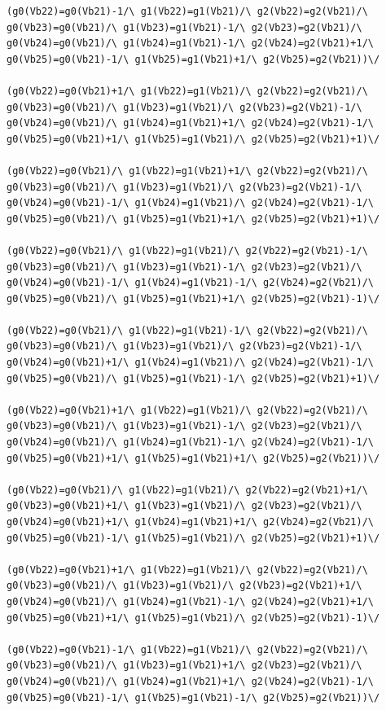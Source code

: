 \begin{appendices}
\begin{lstlisting}
(g0(Vb22)=g0(Vb21)-1/\ g1(Vb22)=g1(Vb21)/\ g2(Vb22)=g2(Vb21)/\ g0(Vb23)=g0(Vb21)/\ g1(Vb23)=g1(Vb21)-1/\ g2(Vb23)=g2(Vb21)/\ g0(Vb24)=g0(Vb21)/\ g1(Vb24)=g1(Vb21)-1/\ g2(Vb24)=g2(Vb21)+1/\ g0(Vb25)=g0(Vb21)-1/\ g1(Vb25)=g1(Vb21)+1/\ g2(Vb25)=g2(Vb21))\/ 

(g0(Vb22)=g0(Vb21)+1/\ g1(Vb22)=g1(Vb21)/\ g2(Vb22)=g2(Vb21)/\ g0(Vb23)=g0(Vb21)/\ g1(Vb23)=g1(Vb21)/\ g2(Vb23)=g2(Vb21)-1/\ g0(Vb24)=g0(Vb21)/\ g1(Vb24)=g1(Vb21)+1/\ g2(Vb24)=g2(Vb21)-1/\ g0(Vb25)=g0(Vb21)+1/\ g1(Vb25)=g1(Vb21)/\ g2(Vb25)=g2(Vb21)+1)\/ 

(g0(Vb22)=g0(Vb21)/\ g1(Vb22)=g1(Vb21)+1/\ g2(Vb22)=g2(Vb21)/\ g0(Vb23)=g0(Vb21)/\ g1(Vb23)=g1(Vb21)/\ g2(Vb23)=g2(Vb21)-1/\ g0(Vb24)=g0(Vb21)-1/\ g1(Vb24)=g1(Vb21)/\ g2(Vb24)=g2(Vb21)-1/\ g0(Vb25)=g0(Vb21)/\ g1(Vb25)=g1(Vb21)+1/\ g2(Vb25)=g2(Vb21)+1)\/ 

(g0(Vb22)=g0(Vb21)/\ g1(Vb22)=g1(Vb21)/\ g2(Vb22)=g2(Vb21)-1/\ g0(Vb23)=g0(Vb21)/\ g1(Vb23)=g1(Vb21)-1/\ g2(Vb23)=g2(Vb21)/\ g0(Vb24)=g0(Vb21)-1/\ g1(Vb24)=g1(Vb21)-1/\ g2(Vb24)=g2(Vb21)/\ g0(Vb25)=g0(Vb21)/\ g1(Vb25)=g1(Vb21)+1/\ g2(Vb25)=g2(Vb21)-1)\/ 

(g0(Vb22)=g0(Vb21)/\ g1(Vb22)=g1(Vb21)-1/\ g2(Vb22)=g2(Vb21)/\ g0(Vb23)=g0(Vb21)/\ g1(Vb23)=g1(Vb21)/\ g2(Vb23)=g2(Vb21)-1/\ g0(Vb24)=g0(Vb21)+1/\ g1(Vb24)=g1(Vb21)/\ g2(Vb24)=g2(Vb21)-1/\ g0(Vb25)=g0(Vb21)/\ g1(Vb25)=g1(Vb21)-1/\ g2(Vb25)=g2(Vb21)+1)\/ 

(g0(Vb22)=g0(Vb21)+1/\ g1(Vb22)=g1(Vb21)/\ g2(Vb22)=g2(Vb21)/\ g0(Vb23)=g0(Vb21)/\ g1(Vb23)=g1(Vb21)-1/\ g2(Vb23)=g2(Vb21)/\ g0(Vb24)=g0(Vb21)/\ g1(Vb24)=g1(Vb21)-1/\ g2(Vb24)=g2(Vb21)-1/\ g0(Vb25)=g0(Vb21)+1/\ g1(Vb25)=g1(Vb21)+1/\ g2(Vb25)=g2(Vb21))\/ 

(g0(Vb22)=g0(Vb21)/\ g1(Vb22)=g1(Vb21)/\ g2(Vb22)=g2(Vb21)+1/\ g0(Vb23)=g0(Vb21)+1/\ g1(Vb23)=g1(Vb21)/\ g2(Vb23)=g2(Vb21)/\ g0(Vb24)=g0(Vb21)+1/\ g1(Vb24)=g1(Vb21)+1/\ g2(Vb24)=g2(Vb21)/\ g0(Vb25)=g0(Vb21)-1/\ g1(Vb25)=g1(Vb21)/\ g2(Vb25)=g2(Vb21)+1)\/ 

(g0(Vb22)=g0(Vb21)+1/\ g1(Vb22)=g1(Vb21)/\ g2(Vb22)=g2(Vb21)/\ g0(Vb23)=g0(Vb21)/\ g1(Vb23)=g1(Vb21)/\ g2(Vb23)=g2(Vb21)+1/\ g0(Vb24)=g0(Vb21)/\ g1(Vb24)=g1(Vb21)-1/\ g2(Vb24)=g2(Vb21)+1/\ g0(Vb25)=g0(Vb21)+1/\ g1(Vb25)=g1(Vb21)/\ g2(Vb25)=g2(Vb21)-1)\/ 

(g0(Vb22)=g0(Vb21)-1/\ g1(Vb22)=g1(Vb21)/\ g2(Vb22)=g2(Vb21)/\ g0(Vb23)=g0(Vb21)/\ g1(Vb23)=g1(Vb21)+1/\ g2(Vb23)=g2(Vb21)/\ g0(Vb24)=g0(Vb21)/\ g1(Vb24)=g1(Vb21)+1/\ g2(Vb24)=g2(Vb21)-1/\ g0(Vb25)=g0(Vb21)-1/\ g1(Vb25)=g1(Vb21)-1/\ g2(Vb25)=g2(Vb21))\/ 


\end{lstlisting}
\end{appendices}
